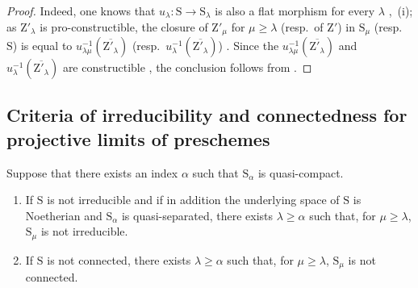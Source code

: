 \begin{proof}
Indeed, one knows that $u_\lambda:\mathrm{S}\to\mathrm{S}_\lambda$ is also a flat morphism for every $\lambda$ ,~(i); as $\mathrm{Z}'_\lambda$ is pro-constructible, the closure of $\mathrm{Z}'_\mu$ for $\mu\geqslant\lambda$ (resp.\ of $\mathrm{Z}'$) in $\mathrm{S}_\mu$ (resp.\ $\mathrm{S}$) is equal to $u_{\lambda\mu}^{-1}(\overline{\mathrm{Z}'_\lambda})$ (resp.\ $u_\lambda^{-1}(\overline{\mathrm{Z}'_\lambda})$) .
Since the $u_{\lambda\mu}^{-1}(\overline{\mathrm{Z}'_\lambda})$ and $u_\lambda^{-1}(\overline{\mathrm{Z}'_\lambda})$ are constructible , the conclusion follows from .
\end{proof}

\subsection{Criteria of irreducibility and connectedness for projective limits of preschemes}
\label{subsection:IV.8.4}

\begin{proposition}[8.4.1]
\label{IV.8.4.1}
Suppose that there exists an index $\alpha$ such that $\mathrm{S}_\alpha$ is quasi-compact.
\begin{enumerate}[label=(\roman*)]
  \item If $\mathrm{S}$ is not irreducible and if in addition the underlying space of $\mathrm{S}$ is Noetherian and $\mathrm{S}_\alpha$ is quasi-separated, there exists $\lambda\geqslant\alpha$ such that, for $\mu\geqslant\lambda$, $\mathrm{S}_\mu$ is not irreducible.
  \item If $\mathrm{S}$ is not connected, there exists $\lambda\geqslant\alpha$ such that, for $\mu\geqslant\lambda$, $\mathrm{S}_\mu$ is not connected.
\end{enumerate}
\end{proposition}

